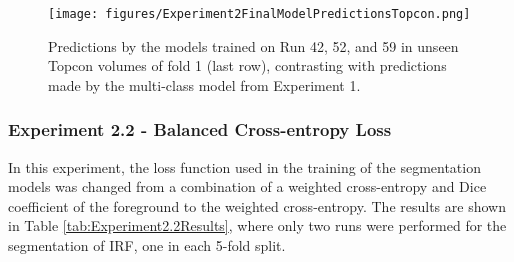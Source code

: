 \begin{figure}[!ht]
	\centering
	\texttt{[image: figures/Experiment2FinalModelPredictionsTopcon.png]}
	\caption{Predictions by the models trained on Run 42, 52, and 59 in unseen Topcon volumes of fold 1 (last row), contrasting with predictions made by the multi-class model from Experiment 1.}
	\label{fig:Experiment2FinalModelPredictionsTopcon}
\end{figure}

\subsubsection{Experiment 2.2 - Balanced Cross-entropy Loss}

In this experiment, the loss function used in the training of the segmentation models was changed from a combination of a weighted cross-entropy and Dice coefficient of the foreground to the weighted cross-entropy. The results are shown in Table \ref{tab:Experiment2.2Results}, where only two runs were performed for the segmentation of IRF, one in each 5-fold split. 


